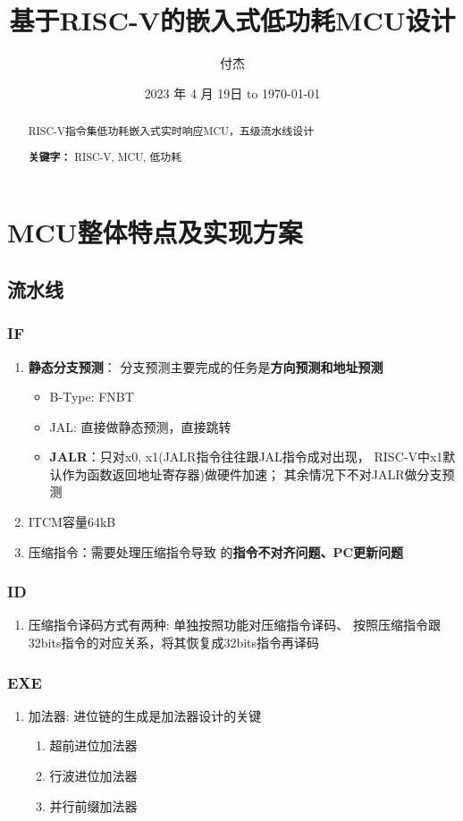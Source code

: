\documentclass{article}
\title{基于RISC-V的嵌入式低功耗MCU设计}
\author{付杰}
\date{2023 年 4 月 19日 to \today}
\begin{document}
\maketitle
\newpage

\begin{abstract} %
  RISC-V指令集低功耗嵌入式实时响应MCU，五级流水线设计
  \par\textbf{关键字：} RISC-V, MCU, 低功耗
\end{abstract}
\newpage

\tableofcontents %
\newpage


\section{MCU整体特点及实现方案}
\subsection{流水线}
\subsubsection{IF}
\begin{enumerate}
  \item \textbf{静态分支预测}：
  分支预测主要完成的任务是\textbf{方向预测和地址预测}\cite{riscv1}
    \begin{itemize}
      \item B-Type: FNBT
      \item JAL: 直接做静态预测，直接跳转
      \item \textbf{JALR}：只对x0, x1(JALR指令往往跟JAL指令成对出现，
        RISC-V中x1默认作为函数返回地址寄存器)做硬件加速；
        其余情况下不对JALR做分支预测
    \end{itemize}
  \item ITCM容量64kB\cite{riscv1}
  \item 压缩指令：需要处理压缩指令导致
    的\textbf{指令不对齐问题、PC更新问题}\cite{riscv1}
\end{enumerate}
\subsubsection{ID}
\begin{enumerate}
  \item 压缩指令译码方式有两种: 单独按照功能对压缩指令译码\cite{riscv1}、
    按照压缩指令跟32bits指令的对应关系，将其恢复成32bits指令再译码
\end{enumerate}
\subsubsection{EXE}
\begin{enumerate}
  \item 加法器: 进位链的生成是加法器设计的关键\cite{riscv1}
    \begin{enumerate}
      \item 超前进位加法器
      \item 行波进位加法器
      \item 并行前缀加法器
    \end{enumerate}
\end{enumerate}
\end{document}
